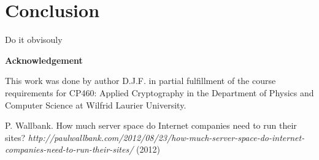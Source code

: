 \documentclass[12pt]{article}
\begin{document}
\section{Conclusion}\label{sec:conclusion}
Do it obvisouly

\begin{center}
{\bf Acknowledgement}
\end{center}
This work was done by author D.J.F. in partial fulfillment of the course requirements for CP460: Applied Cryptography in the Department of Physics and Computer Science at Wilfrid Laurier University.

\clearpage
\begin{thebibliography}{99}

	P. Wallbank. How much server space do Internet companies need to run their sites? {\sl http://paulwallbank.com/2012/08/23/how-much-server-space-do-internet-companies-need-to-run-their-sites/} (2012)
	
\end{thebibliography}
\end{document}
